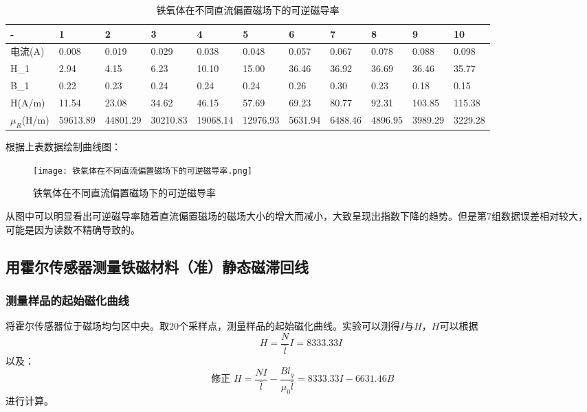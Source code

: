 \documentclass[11pt]{article}
\begin{document}
\begin{table}[H]
    \centering
    \begin{tabular}{|l|l|l|l|l|l|l|l|l|l|l|}
    \hline
        - & 1 & 2 & 3 & 4 & 5 & 6 & 7 & 8 & 9 & 10 \\ \hline
        电流(A) & 0.008 & 0.019 & 0.029 & 0.038 & 0.048 & 0.057 & 0.067 & 0.078 & 0.088 & 0.098 \\ \hline
        H_1 & 2.94  & 4.15  & 6.23  & 10.10  & 15.00  & 36.46  & 36.92  & 36.69  & 36.46  & 35.77 \\ \hline
        B_1 & 0.22  & 0.23  & 0.24  & 0.24  & 0.24  & 0.26  & 0.30  & 0.23  & 0.18  & 0.15 \\ \hline
        H(A/m) & 11.54 & 23.08 & 34.62 & 46.15 & 57.69 & 69.23 & 80.77 & 92.31 & 103.85 & 115.38 \\ \hline
        $\mu_R$(H/m) & 59613.89  & 44801.29  & 30210.83  & 19068.14  & 12976.93  & 5631.94  & 6488.46  & 4896.95  & 3989.29  & 3229.28 \\ \hline
    \end{tabular}
    \caption{铁氧体在不同直流偏置磁场下的可逆磁导率}
\end{table}

根据上表数据绘制曲线图：

\begin{figure}[H]
    \centering
    \texttt{[image: 铁氧体在不同直流偏置磁场下的可逆磁导率.png]}
    \caption{铁氧体在不同直流偏置磁场下的可逆磁导率}
\end{figure}

从图中可以明显看出可逆磁导率随着直流偏置磁场的磁场大小的增大而减小，大致呈现出指数下降的趋势。但是第7组数据误差相对较大，可能是因为读数不精确导致的。

\subsection{用霍尔传感器测量铁磁材料（准）静态磁滞回线}

\subsubsection{测量样品的起始磁化曲线}

将霍尔传感器位于磁场均匀区中央。取20个采样点，测量样品的起始磁化曲线。实验可以测得$I$与$H$，$H$可以根据\begin{displaymath}H=\frac{N}{\bar{l}}I=8333.33I\end{displaymath}以及：\begin{displaymath}\text{ 修正 } H=\frac{NI}{\bar{l}}-\frac{Bl_g}{\mu_0\bar{l}}=8333.33I-6631.46B\end{displaymath}进行计算。
\end{document}

